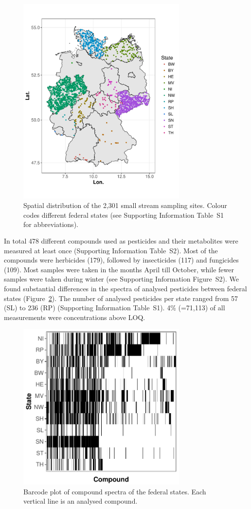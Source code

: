 \documentclass[journal=esthag,manuscript=article]{achemso}
\begin{document}
\begin{figure}[ht]
  \includegraphics[width=3.33in]{figure1.pdf}
  \caption{Spatial distribution of the 2,301 small stream sampling sites. Colour codes different federal states (see Supporting Information Table~S1 for abbreviations).}
  \label{fig:fig1}
\end{figure}

In total 478 different compounds used as pesticides and their metabolites were measured at least once (Supporting Information Table~S2). 
Most of the compounds were herbicides (179), followed by insecticides (117) and fungicides (109). %
Most samples were taken in the months April till October, while fewer samples were taken during winter (see Supporting Information Figure~S2).
We found substantial differences in the spectra of analysed pesticides between federal states (Figure~\ref{fig:fig2}).
The number of analysed pesticides per state ranged from 57 (SL) to 236 (RP) (Supporting Information Table~S1). 
4\% (=71,113) of all measurements were concentrations above LOQ.

\begin{figure}[ht]
  \includegraphics[width=3.33in]{figure2.pdf}
  \caption{Barcode plot of compound spectra of the federal states. Each vertical line is an analysed compound.}
  \label{fig:fig2}
\end{figure}
\end{document}
